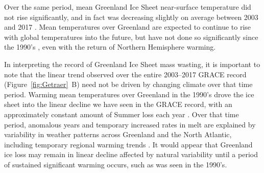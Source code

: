 \documentclass[11pt]{report}
\begin{document}

Over the same period, mean Greenland Ice Sheet near-surface temperature did not rise significantly, and in fact was decreasing slightly on average between 2003 and 2017 \cite[see Figs.~\ref{fig:seasonalclimate}~\&~\ref{fig:tslopes}, and ][]{hearty2018, westergaard2018,reeves2017}. Mean temperatures over Greenland are expected to continue to rise with global temperatures into the future, but have not done so significantly since the 1990's \cite[][]{reeves2017}, even with the return of Northern Hemisphere warming.

In interpreting the record of Greenland Ice Sheet mass wasting, it is important to note that the linear trend observed over the entire 2003--2017 GRACE record (Figure~\ref{fig:Getraer}~B) need not be driven by changing climate over that time period. Warming mean temperatures over Greenland in the 1990's drove the ice sheet into the linear decline we have seen in the GRACE record, with an approximately constant amount of Summer loss each year \cite[][]{getraerFall}. Over that time period, anomalous years and temporary increased rates in melt are explained by variability in weather patterns across Greenland and the North Atlantic, including temporary regional warming trends \cite[see Figure~\ref{fig:tslopesSummer}][]{bevis2019,hahn2018}. It would appear that Greenland ice loss may remain in linear decline affected by natural variability until a period of sustained significant warming occurs, such as was seen in the 1990's.




%
\end{document}
